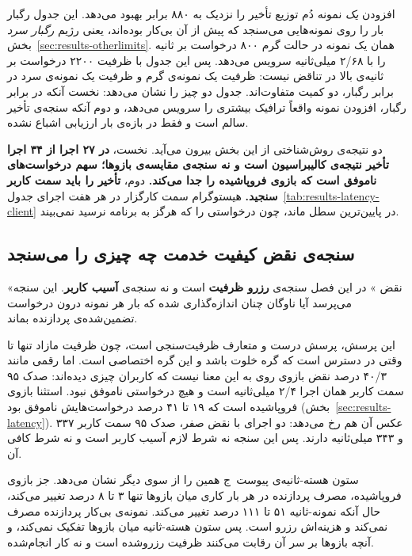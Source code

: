 افزودن \emph{یک} نمونه دُم توزیع تأخیر را نزدیک به ۸۸۰ برابر بهبود می‌دهد. این جدول رگبار
بار را روی نمونه‌هایی می‌سنجد که پیش از آن بی‌کار بوده‌اند، یعنی رژیم \emph{رگبار سرد}
بخش~\ref{sec:results-otherlimits}. همان یک نمونه در حالت گرم ۸۰۰ درخواست بر ثانیه را با ۲/۶۸
میلی‌ثانیه سرویس می‌دهد. پس این جدول با ظرفیت ۲۲۰۰ درخواست بر ثانیه‌ی بالا در تناقض نیست:
ظرفیت یک نمونه‌ی گرم و ظرفیت یک نمونه‌ی سرد در برابر رگبار، دو کمیت متفاوت‌اند. جدول دو چیز را
نشان می‌دهد: نخست آنکه در برابر رگبار، افزودن نمونه واقعاً ترافیک بیشتری را سرویس می‌دهد، و
دوم آنکه سنجه‌ی تأخیر سالم است و فقط در بازه‌ی بار ارزیابی اشباع نشده.

دو نتیجه‌ی روش‌شناختی از این بخش بیرون می‌آید. نخست، \textbf{در ۲۷ اجرا از ۳۴ اجرا تأخیر
نتیجه‌ی کالیبراسیون است و نه سنجه‌ی مقایسه‌ی بازوها؛ سهم درخواست‌های ناموفق است که بازوی
فروپاشیده را جدا می‌کند.} دوم، \textbf{تأخیر را باید سمت کاربر سنجید.} هیستوگرام سمت کارگزار
در هر هفت اجرای جدول~\ref{tab:results-latency-client} در پایین‌ترین سطل ماند، چون درخواستی را
که هرگز به برنامه نرسید نمی‌بیند.

\subsection{سنجه‌ی نقض کیفیت خدمت چه چیزی را می‌سنجد}
\label{sec:results-slameaning}

«نقض » در این فصل سنجه‌ی \textbf{رزرو ظرفیت} است و نه
سنجه‌ی \textbf{آسیب کاربر}. این سنجه می‌پرسد آیا ناوگان چنان اندازه‌گذاری شده که بار هر نمونه
درون درخواست تضمین‌شده‌ی پردازنده بماند.

این پرسش، پرسش درست و متعارف ظرفیت‌سنجی است، چون ظرفیت مازاد تنها تا وقتی در دسترس است که گره
خلوت باشد و این گره اختصاصی است. اما رقمی مانند ۴۰/۳ درصد نقض بازوی  روی
 به این معنا نیست که کاربران چیزی دیده‌اند: صدک ۹۵ سمت کاربر همان اجرا ۲/۴
میلی‌ثانیه است و هیچ درخواستی ناموفق نبود. استثنا بازوی فروپاشیده است که ۱۹ تا ۴۱ درصد درخواست‌هایش ناموفق بود
(بخش~\ref{sec:results-latency}). عکس آن هم رخ می‌دهد: دو اجرای  با نقض صفر، صدک ۹۵
سمت کاربر ۳۳۷ و ۳۴۳ میلی‌ثانیه دارند. پس این سنجه نه شرط لازم آسیب کاربر است و نه شرط کافی آن.

ستون هسته-ثانیه‌ی پیوست~ج همین را از سوی دیگر نشان می‌دهد. جز بازوی فروپاشیده، مصرف پردازنده
در هر بار کاری میان بازوها تنها ۳ تا ۸ درصد تغییر می‌کند، حال آنکه نمونه-ثانیه ۵۱ تا ۱۱۱ درصد
تغییر می‌کند. نمونه‌ی بی‌کار پردازنده مصرف نمی‌کند و هزینه‌اش رزرو است. پس ستون هسته-ثانیه میان
بازوها تفکیک نمی‌کند، و آنچه بازوها بر سر آن رقابت می‌کنند ظرفیت رزروشده است و نه کار انجام‌شده.

